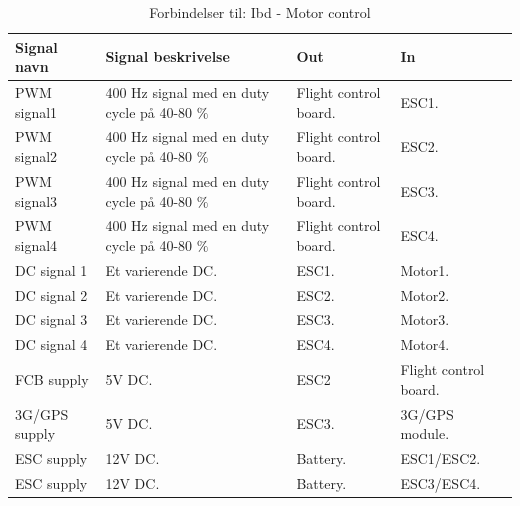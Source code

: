 \begin{table}[H]
	\centering
		\begin{tabular}{|p{2.7 cm}|p{5.5 cm}|p{2.5 cm}|p{2.5 cm}|} 
		\hline
			\textbf{Signal navn} 	& \textbf{Signal beskrivelse}		& \textbf{Out} 				& \textbf{In}     \\ \hline
			PWM signal1 & 400 Hz signal med en duty cycle på 40-80 $\%$ & Flight control board. & ESC1.	\\ \hline
			PWM signal2 & 400 Hz signal med en duty cycle på 40-80 $\%$ & Flight control board. & ESC2.	\\ \hline
			PWM signal3 & 400 Hz signal med en duty cycle på 40-80 $\%$ & Flight control board. &	ESC3. \\ \hline
			PWM signal4 & 400 Hz signal med en duty cycle på 40-80 $\%$ & Flight control board. & ESC4. \\ \hline
			DC signal 1 & Et varierende DC. & ESC1. & Motor1.	\\ \hline
			DC signal 2 & Et varierende DC. & ESC2. & Motor2.	\\ \hline
			DC signal 3 & Et varierende DC. & ESC3. & Motor3.	\\ \hline
			DC signal 4 & Et varierende DC. & ESC4. & Motor4.	\\ \hline
			FCB supply & 5V DC. & ESC2 & Flight control board.	\\ \hline
			3G/GPS supply & 5V DC. & ESC3. & 3G/GPS module.	\\ \hline
			ESC supply & 12V DC. & Battery. & ESC1/ESC2.	\\ \hline
			ESC supply & 12V DC. & Battery. & ESC3/ESC4.	\\ \hline
			
		\end{tabular}
	\caption{Forbindelser til: Ibd - Motor control}
	\label{tab:IBD_Motor_control}
\end{table}

